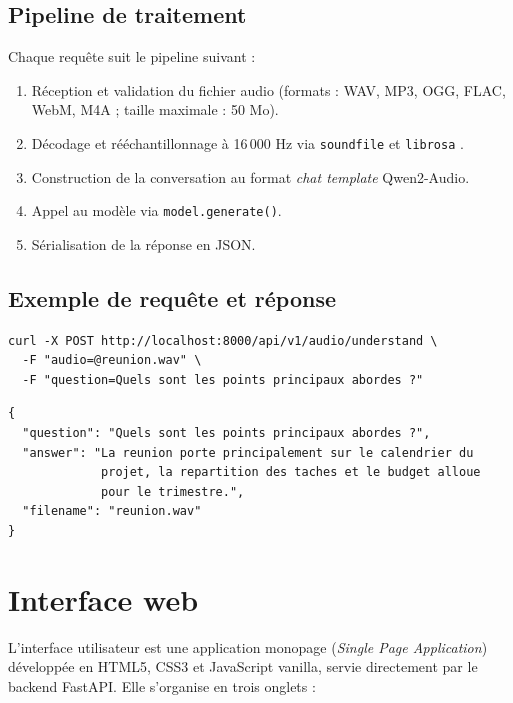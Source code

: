 \documentclass[12pt,a4paper]{report}
\begin{document}
\subsection{Pipeline de traitement}

Chaque requête suit le pipeline suivant :

\begin{enumerate}
  \item Réception et validation du fichier audio (formats : WAV, MP3, OGG, FLAC, WebM,
        M4A ; taille maximale : 50 Mo).
  \item Décodage et rééchantillonnage à 16\,000 Hz via \texttt{soundfile} et
        \texttt{librosa} \cite{librosa}.
  \item Construction de la conversation au format \textit{chat template} Qwen2-Audio.
  \item Appel au modèle via \texttt{model.generate()}.
  \item Sérialisation de la réponse en JSON.
\end{enumerate}

\subsection{Exemple de requête et réponse}

\begin{lstlisting}[style=bash, caption={Requête cURL vers /understand}]
curl -X POST http://localhost:8000/api/v1/audio/understand \
  -F "audio=@reunion.wav" \
  -F "question=Quels sont les points principaux abordes ?"
\end{lstlisting}

\begin{lstlisting}[style=json, caption={Réponse JSON de l'endpoint /understand}]
{
  "question": "Quels sont les points principaux abordes ?",
  "answer": "La reunion porte principalement sur le calendrier du
             projet, la repartition des taches et le budget alloue
             pour le trimestre.",
  "filename": "reunion.wav"
}
\end{lstlisting}

\section{Interface web}

L'interface utilisateur est une application monopage (\textit{Single Page Application})
développée en HTML5, CSS3 et JavaScript vanilla, servie directement par le backend FastAPI.
Elle s'organise en trois onglets :
\end{document}
